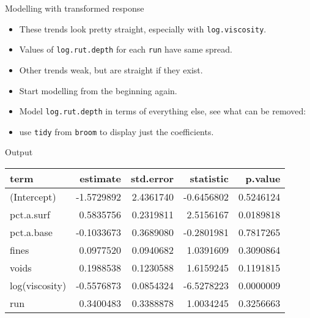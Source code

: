 \begin{frame}[fragile]{Modelling with transformed response}
\protect\hypertarget{modelling-with-transformed-response}{}
\begin{itemize}
\tightlist
\item
  These trends look pretty straight, especially with
  \texttt{log.viscosity}.
\item
  Values of \texttt{log.rut.depth} for each \texttt{run} have same
  spread.
\item
  Other trends weak, but are straight if they exist.
\item
  Start modelling from the beginning again.
\item
  Model \texttt{log.rut.depth} in terms of everything else, see what can
  be removed:
\end{itemize}

\begin{Shaded}
\begin{Highlighting}[]
\NormalTok{ \textless{}{-}}\StringTok{ }\NormalTok{(}\OperatorTok{\textasciitilde{}}\StringTok{ }\OperatorTok{+}\StringTok{ }\OperatorTok{+}
\StringTok{  }\OperatorTok{+}\StringTok{ }\OperatorTok{+}\StringTok{ }\OperatorTok{+}\StringTok{ }
\end{Highlighting}
\end{Shaded}

\begin{itemize}
\tightlist
\item
  use \texttt{tidy} from \texttt{broom} to display just the
  coefficients.
\end{itemize}
\end{frame}

\begin{frame}[fragile]{Output}
\protect\hypertarget{output}{}
\begin{Shaded}
\begin{Highlighting}[]
\NormalTok{)}
\end{Highlighting}
\end{Shaded}

\begin{longtable}[]{@{}lrrrr@{}}
\toprule
term & estimate & std.error & statistic & p.value\tabularnewline
\midrule
\endhead
(Intercept) & -1.5729892 & 2.4361740 & -0.6456802 &
0.5246124\tabularnewline
pct.a.surf & 0.5835756 & 0.2319811 & 2.5156167 &
0.0189818\tabularnewline
pct.a.base & -0.1033673 & 0.3689080 & -0.2801981 &
0.7817265\tabularnewline
fines & 0.0977520 & 0.0940682 & 1.0391609 & 0.3090864\tabularnewline
voids & 0.1988538 & 0.1230588 & 1.6159245 & 0.1191815\tabularnewline
log(viscosity) & -0.5576873 & 0.0854324 & -6.5278223 &
0.0000009\tabularnewline
run & 0.3400483 & 0.3388878 & 1.0034245 & 0.3256663\tabularnewline
\bottomrule
\end{longtable}
\end{frame}


